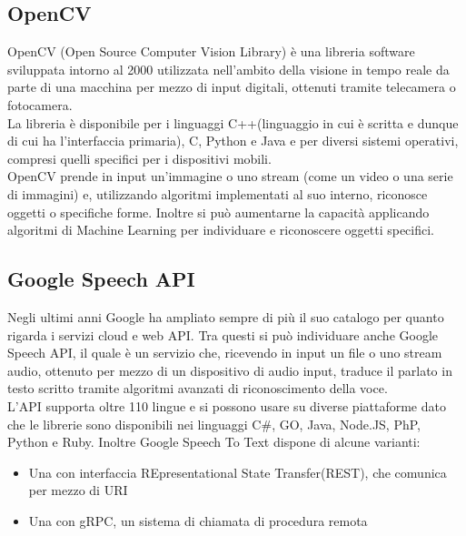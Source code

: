 \subsection{OpenCV}
OpenCV (Open Source Computer Vision Library) \`e una libreria software sviluppata intorno al 2000
utilizzata nell'ambito della visione in tempo reale
da parte di una macchina per mezzo di input digitali, ottenuti tramite telecamera o fotocamera.\\
La libreria \`e disponibile per i linguaggi C++(linguaggio in cui \`e scritta e dunque di cui ha l'interfaccia primaria), C, Python e Java e
per diversi sistemi operativi, compresi quelli specifici per i dispositivi mobili.\\
OpenCV prende in input un'immagine o uno stream (come un video o una serie di immagini) e, utilizzando algoritmi
 implementati al suo interno, riconosce oggetti o specifiche forme.
Inoltre si pu\`o aumentarne la capacit\`a
applicando algoritmi di Machine Learning per individuare e riconoscere oggetti specifici.

\subsection{Google Speech API}
Negli ultimi anni Google ha ampliato sempre di pi\`u il suo catalogo per quanto rigarda
i servizi cloud e web API.
Tra questi si pu\`o individuare anche Google Speech API, il quale \`e un
servizio che, ricevendo in input un file o uno stream audio, ottenuto per mezzo di un
dispositivo di audio input, traduce il parlato in testo scritto tramite algoritmi avanzati
di riconoscimento della voce.\\
L'API supporta oltre 110 lingue e si possono usare su diverse piattaforme dato che
le librerie sono disponibili nei linguaggi C\#, GO, Java, Node.JS, PhP, Python e Ruby.
Inoltre Google Speech To Text dispone di alcune varianti:
\begin{itemize}
\item Una con interfaccia REpresentational State Transfer(REST), che comunica per mezzo di URI
\item Una con gRPC, un sistema di chiamata di procedura remota
\end{itemize}

\iffalse

